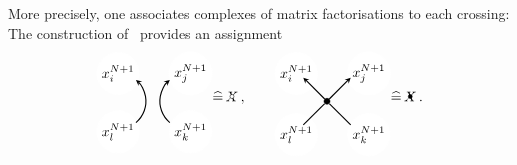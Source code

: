 \documentclass{compositio}
\theoremstyle{definition}
\numberwithin{equation}{section}
\begin{document}
More precisely, one associates complexes of matrix factorisations to each crossing: The construction of~\cite{kr0401268} provides an assignment
\begin{equation}
\label{DeltaX}
\begin{tikzpicture}[scale=0.7,baseline, inner sep=1mm, >=stealth]
\node (1) at (-2.5,1.0) [circle,inner sep=1.5pt, draw=white,fill= white] {$x^{N+1}_{i}$};
\node (2) at (0.1,1.0) [circle,inner sep=1.5pt, draw=white,fill= white] {$x^{N+1}_{j}$};
\node (3) at (0.1,-1.1) [circle,inner sep=1.5pt, draw=white,fill= white] {$x^{N+1}_{k}$};
\node (3) at (-2.5,-1.1) [circle,inner sep=1.5pt, draw=white,fill= white] {$x^{N+1}_{l}$};
\draw[ ->, thick, shift={(-2.5,0)} ]  (-50:1) arc (-50:50:1); 
\draw[ ->, thick ] (230:1) arc (230:130:1); 
\end{tikzpicture}
\widehat = \,
\Xcirc \, ,
\qquad 
\begin{tikzpicture}[scale=0.7,baseline, inner sep=1mm, >=stealth]
\node (1) at (-1.1,1.0) [circle,inner sep=1.5pt, draw=white,fill= white] {$x^{N+1}_{i}$};
\node (2) at (1.5,1.0) [circle,inner sep=1.5pt, draw=white,fill= white] {$x^{N+1}_{j}$};
\node (3) at (1.5,-1.2) [circle,inner sep=1.5pt, draw=white,fill= white] {$x^{N+1}_{k}$};
\node (3) at (-1.1,-1.2) [circle,inner sep=1.5pt, draw=white,fill= white] {$x^{N+1}_{l}$};
\node (0) at (0,0) [circle,inner sep=1.5pt, thin,draw=black,fill= black] {};
\node (bl) at (-1,-1) [circle] {};
\node (br) at (1,-1) [circle] {};
\node (tl) at (-1,1) [circle] {};
\node (tr) at (1,1) [circle] {};
\draw[-,  thick] (bl) -- (0); 
\draw[-,  thick] (br) -- (0); 
\draw[->,  thick] (0) -- (tl); 
\draw[->,  thick] (0) -- (tr); 
\end{tikzpicture}
\widehat = \,
\Xbul\,.
\end{equation}
\end{document}
